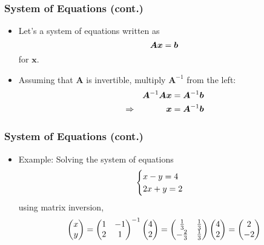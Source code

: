 \documentclass[pdflatex, 12pt]{beamer}
\begin{document}
\begin{frame}
\frametitle{System of Equations (cont.)}
\begin{itemize}
\item Let's a system of equations written as 
 \begin{equation}
 \bm{Ax} = \bm{b} \notag 
 \end{equation}
for $\bm{x}$.
\vspace{0.4cm}
\item Assuming that $\bm{A}$ is invertible, multiply $\bm{A}^{-1}$ from the left:
 \begin{eqnarray}
 && \bm{A}^{-1}\bm{Ax} = \bm{A}^{-1}\bm{b} \notag \\
 &\Rightarrow& \bm{x} = \bm{A}^{-1}\bm{b} \notag
 \end{eqnarray}
\end{itemize}
\end{frame}

\begin{frame}
\frametitle{System of Equations (cont.)}
\begin{itemize}
\item Example: Solving the system of equations
 \begin{eqnarray}
 \begin{cases}
 x - y = 4 \\
 2x + y = 2 \notag
 \end{cases}
 \end{eqnarray}
using matrix inversion,
 \begin{equation}
 \begin{pmatrix}
 x \\
 y \\
 \end{pmatrix} = \begin{pmatrix}
 1 & -1 \\
 2 & 1 \\
 \end{pmatrix}^{-1} \begin{pmatrix}
 4 \\
 2 \\
 \end{pmatrix} = \begin{pmatrix}
 \frac{1}{3} & \frac{1}{3} \\
 -\frac{2}{3} & \frac{1}{3} \\
 \end{pmatrix} \begin{pmatrix}
 4 \\
 2 \\
 \end{pmatrix} = \begin{pmatrix}
 2 \\
 -2 \\
 \end{pmatrix} \notag
 \end{equation}
\end{itemize}
\end{frame}
\end{document}
